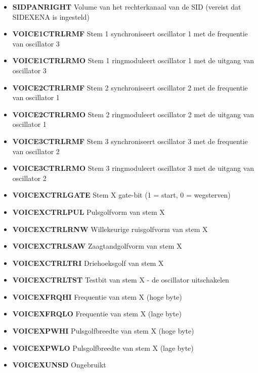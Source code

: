 \begin{itemize}
\item{\bf{SIDPANRIGHT}} Volume van het rechterkanaal van de SID (vereist dat SIDEXENA is ingesteld)
\item{\bf{VOICE1CTRLRMF}} Stem 1 synchroniseert oscillator 1 met de frequentie van oscillator 3
\item{\bf{VOICE1CTRLRMO}} Stem 1 ringmoduleert oscillator 1 met de uitgang van oscillator 3
\item{\bf{VOICE2CTRLRMF}} Stem 2 synchroniseert oscillator 2 met de frequentie van oscillator 1
\item{\bf{VOICE2CTRLRMO}} Stem 2 ringmoduleert oscillator 2 met de uitgang van oscillator 1
\item{\bf{VOICE3CTRLRMF}} Stem 3 synchroniseert oscillator 3 met de frequentie van oscillator 2
\item{\bf{VOICE3CTRLRMO}} Stem 3 ringmoduleert oscillator 3 met de uitgang van oscillator 2
\item{\bf{VOICEXCTRLGATE}} Stem X gate-bit (1 = start, 0 = wegsterven)
\item{\bf{VOICEXCTRLPUL}} Pulsgolfvorm van stem X
\item{\bf{VOICEXCTRLRNW}} Willekeurige ruisgolfvorm van stem X
\item{\bf{VOICEXCTRLSAW}} Zaagtandgolfvorm van stem X
\item{\bf{VOICEXCTRLTRI}} Driehoeksgolf van stem X
\item{\bf{VOICEXCTRLTST}} Testbit van stem X - de oscillator uitschakelen
\item{\bf{VOICEXFRQHI}} Frequentie van stem X (hoge byte)
\item{\bf{VOICEXFRQLO}} Frequentie van stem X (lage byte)
\item{\bf{VOICEXPWHI}} Pulsgolfbreedte van stem X (hoge byte)
\item{\bf{VOICEXPWLO}} Pulsgolfbreedte van stem X (lage byte)
\item{\bf{VOICEXUNSD}} Ongebruikt
\end{itemize}
